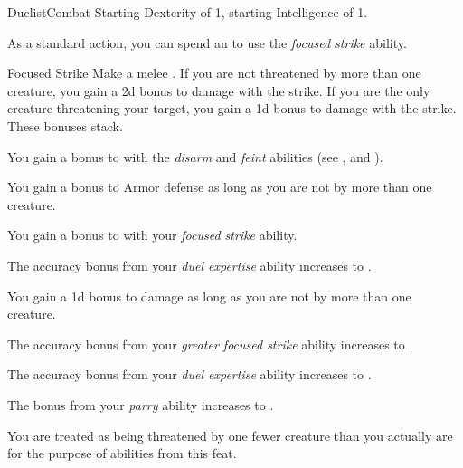     \begin{feat}{Duelist}{Combat}
        \featpre Starting Dexterity of 1, starting Intelligence of 1.

         As a standard action, you can spend an  to use the \textit{focused strike} ability.
        \begin{ability}{Focused Strike}
            Make a melee .
            If you are not threatened by more than one creature, you gain a \plus2d bonus to damage with the strike.
            If you are the only creature threatening your target, you gain a \plus1d bonus to damage with the strike.
            These bonuses stack.
        \end{ability}

         You gain a  bonus to  with the \textit{disarm} and \textit{feint} abilities (see , and ).

         You gain a  bonus to Armor defense as long as you are not  by more than one creature.

         You gain a  bonus to  with your \textit{focused strike} ability.

         The accuracy bonus from your \textit{duel expertise} ability increases to . 

         You gain a \plus1d bonus to damage as long as you are not  by more than one creature.

         The accuracy bonus from your \textit{greater focused strike} ability increases to .

         The accuracy bonus from your \textit{duel expertise} ability increases to . 

         The bonus from your \textit{parry} ability increases to .

         You are treated as being threatened by one fewer creature than you actually are for the purpose of abilities from this feat.
    \end{feat}

